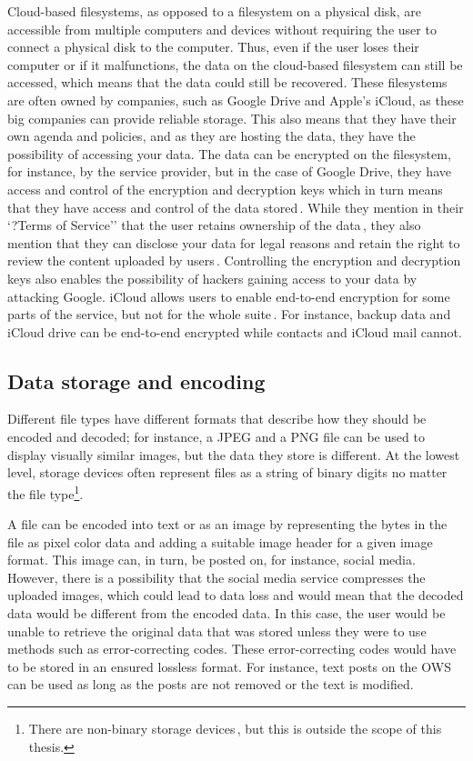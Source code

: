 Cloud-based filesystems, as opposed to a filesystem on a physical disk, are accessible from multiple computers and devices without requiring the user to connect a physical disk to the computer. Thus, even if the user loses their computer or if it malfunctions, the data on the \mbox{cloud-based} filesystem can still be accessed, which means that the data could still be recovered. These filesystems are often owned by companies, such as Google Drive and Apple's iCloud, as these big companies can provide reliable storage. This also means that they have their own agenda and policies, and as they are hosting the data, they have the possibility of accessing your data. The data can be encrypted on the filesystem, for instance, by the service provider, but in the case of Google Drive, they have access and control of the encryption and decryption keys which in turn means that they have access and control of the data stored\,\cite{johnsonGoogleDriveSecure2021}. While they mention in their `?Terms of Service'' that the user retains ownership of the data\,\cite{googleGoogleDriveTerms}, they also mention that they can disclose your data for legal reasons and retain the right to review the content uploaded by users\,\cite{googleGoogleTermsService}. Controlling the encryption and decryption keys also enables the possibility of hackers gaining access to your data by attacking Google. iCloud allows users to enable \mbox{end-to-end} encryption for some parts of the service, but not for the whole suite\,\cite{appleinc.ICloudDataSecurity}. For instance, backup data and iCloud drive can be \mbox{end-to-end} encrypted while contacts and iCloud mail cannot.

\subsection{Data storage and encoding}
\label{sec:data_storage}
Different file types have different formats that describe how they should be encoded and decoded; for instance, a JPEG and a PNG file can be used to display visually similar images, but the data they store is different. At the lowest level, storage devices often represent files as a string of binary digits no matter the file type\footnote{There are \mbox{non-binary} storage devices\,\cite{MultistateDataStorage2020}, but this is outside the scope of this thesis.}.

A file can be encoded into text or as an image by representing the bytes in the file as pixel color data and adding a suitable image header for a given image format. This image can, in turn, be posted on, for instance, social media. However, there is a possibility that the social media service compresses the uploaded images, which could lead to data loss and would mean that the decoded data would be different from the encoded data. In this case, the user would be unable to retrieve the original data that was stored unless they were to use methods such as \mbox{error-correcting} codes. These \mbox{error-correcting} codes would have to be stored in an ensured lossless format. For instance, text posts on the \gls{OWS} can be used as long as the posts are not removed or the text is modified.